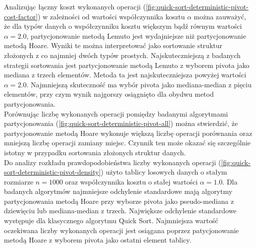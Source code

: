 Analizując łączny koszt wykonanych operacji (\ref{fig:quick-sort-deterministic-pivot-cost-factor}) w zależności od wartości współczynnika kosztu $\alpha$ można zauważyć, że dla typów danych o współczynniku kosztu większym bądź równym wartości $\alpha = 2.0$, partycjonowanie metodą Lemuto jest wydajniejsze niż partycjonowanie metodą Hoare. Wyniki te można interpretować jako sortowanie struktur złożonych z co najmniej dwóch typów prostych. Najskuteczniejszą z badanych strategii sortowania jest partycjonowanie metodą Lemuto z wyborem pivota jako mediana z trzech elementów. Metoda ta jest najskuteczniejsza powyżej wartości $\alpha = 2.0$. Najmniejszą skuteczność ma wybór pivota jako mediana-median z pięciu elementów, przy czym wynik najgorszy osiągnięto dla obydwu metod partycjonowania.\\

Porównując liczbę wykonanych operacji pomiędzy badanymi algorytmami partycjonowania (\ref{fig:quick-sort-deterministic-pivot-all}) można stwierdzić, że partycjonowanie metodą Hoare wykonuje większą liczbę operacji porównania oraz mniejszą liczbę operacji zamiany miejsc. Czynnik ten może okazać się szczególnie istotny w przypadku sortowania złożonych struktur danych.\\
 
Do analizy rozkładu prawdopodobieństwa liczby wykonanych operacji (\ref{fig:quick-sort-deterministic-pivot-density}) użyto tablicy losowych danych o stałym rozmiarze $n = 1000$ oraz współczynnika kosztu o stałej wartości $\alpha = 1.0$. Dla badanych algorytmów najmniejsze odchylenie standardowe mają algorytmy partycjonowania metodą Hoare przy wyborze pivota jako pseudo-mediana z dziewięciu lub mediana-median z trzech. Największe odchylenie standardowe występuje dla klasycznego algorytmu Quick Sort. Najmniejsza wartość oczekiwana liczby wykonanych operacji jest osiągana poprzez patycjonowanie metodą Hoare z wyborem pivota jako ostatni element tablicy.


\begin{figure}[]
	\centering
	
	\caption[]{}
	\label{fig:quick-sort-deterministic-pivot-random}
\end{figure}

